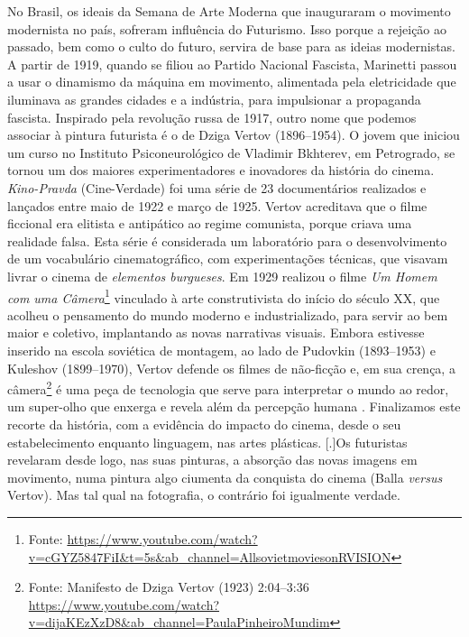 No Brasil, os ideais da Semana de Arte Moderna que inauguraram o
movimento modernista no país, sofreram influência do Futurismo. Isso
porque a rejeição ao passado, bem como o culto do futuro, servira de
base para as ideias modernistas. A partir de 1919, quando se filiou ao
Partido Nacional Fascista, Marinetti passou a usar o dinamismo da
máquina em movimento, alimentada pela eletricidade que iluminava as
grandes cidades e a indústria, para impulsionar a propaganda fascista.
Inspirado pela revolução russa de 1917, outro nome que podemos associar
à pintura futurista é o de Dziga Vertov (1896--1954). O jovem que
iniciou um curso no Instituto Psiconeurológico de Vladimir Bkhterev, em
Petrogrado, se tornou um dos maiores experimentadores e inovadores da
história do cinema. \emph{Kino-Pravda} (Cine-Verdade) foi uma série de
23 documentários realizados e lançados entre maio de 1922 e março de
1925. Vertov acreditava que o filme ficcional era elitista e antipático
ao regime comunista, porque criava uma realidade falsa. Esta série é
considerada um laboratório para o desenvolvimento de um vocabulário
cinematográfico, com experimentações técnicas, que visavam livrar o
cinema de \emph{elementos burgueses}. Em 1929 realizou o filme \emph{Um
	Homem com uma Câmera}\footnote{Fonte:
	\url{https://www.youtube.com/watch?v=cGYZ5847FiI\&t=5s\&ab\_channel=AllsovietmoviesonRVISION}}
vinculado à arte construtivista do início do século XX, que acolheu o
pensamento do mundo moderno e industrializado, para servir ao bem maior
e coletivo, implantando as novas narrativas visuais. Embora estivesse
inserido na escola soviética de montagem, ao lado de Pudovkin
(1893--1953) e Kuleshov (1899--1970), Vertov defende os filmes de
não-ficção e, em sua crença, a câmera\footnote{Fonte: Manifesto de
	Dziga Vertov (1923) 2:04--3:36
	\url{https://www.youtube.com/watch?v=dijaKEzXzD8\&ab\_channel=PaulaPinheiroMundim}}
é uma peça de tecnologia que serve para interpretar o mundo ao redor,
um super-olho que enxerga e revela além da percepção humana
\parencite{rosebud2020dziga}. Finalizamos este recorte da história, com a
evidência do impacto do cinema, desde o seu estabelecimento enquanto
linguagem, nas artes plásticas.
[.]{Os futuristas revelaram desde
	logo, nas suas pinturas, a absorção das novas imagens em movimento,
	numa pintura algo ciumenta da conquista do cinema (Balla \emph{versus}
	Vertov). Mas tal qual na fotografia, o contrário foi igualmente
	verdade}.


